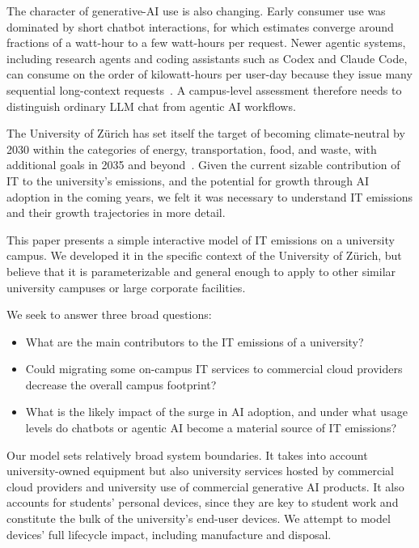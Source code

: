 \documentclass[11pt]{article}
\let\cite\parencite
\begin{document}
The character of generative-AI use is also changing. Early consumer use was
dominated by short chatbot interactions, for which  estimates converge around
fractions of a watt-hour to a few watt-hours per request. Newer agentic systems,
including research agents and coding assistants such as Codex and Claude Code,
can consume on the order of kilowatt-hours per user-day because they issue many
sequential long-context
requests~\cite{jegham2025hungry,ritchie:ai:electricity:2026,couch:claude:code:energy}.
A campus-level assessment therefore needs to distinguish ordinary LLM chat from
agentic AI workflows.

The University of Zürich has set itself the target of becoming climate-neutral
by 2030 within the categories of energy, transportation, food, and waste, with
additional goals in 2035 and beyond~\cite{uzh:sustainability:report}. Given the
current sizable contribution of IT to the university's emissions, and the
potential for growth through AI adoption in the coming years, we felt it was
necessary to understand IT emissions and their growth trajectories in more
detail.

This paper presents a simple interactive model of IT emissions on a university
campus. We developed it in the specific context of the University of Zürich, but
believe that it is parameterizable and general enough to apply to other similar
university campuses or large corporate facilities.

We seek to answer three broad questions:
\begin{itemize}
  \item What are the main contributors to the IT emissions of a university?
  \item Could migrating some on-campus IT services to commercial cloud providers
  decrease the overall campus footprint?
  \item What is the likely impact of the surge in AI adoption, and under what
  usage levels do chatbots or agentic AI become a material source of IT
  emissions?
\end{itemize}

Our model sets relatively broad system boundaries. It takes into account
university-owned equipment but also university services hosted by commercial
cloud providers and university use of commercial generative AI products. It also
accounts for students' personal devices, since they are key to student work and
constitute the bulk of the university's end-user devices. We attempt to model
devices' full lifecycle impact, including manufacture and disposal. 
\end{document}
